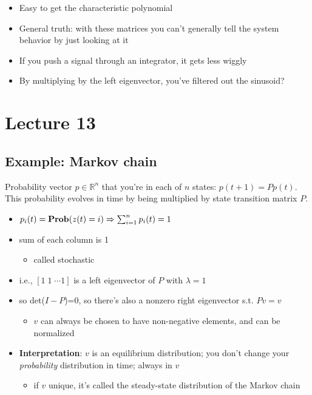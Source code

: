 \documentclass[10pt,letterpaper]{article}
\begin{document}
\begin{itemize}
\item Easy to get the characteristic polynomial
\item General truth: with these matrices you can't generally tell the system behavior by just looking at it
\item If you push a signal through an integrator, it gets less wiggly
\item By multiplying by the left eigenvector, you've filtered out the sinusoid?
\end{itemize}
\section{Lecture 13}
\label{sec-11}
\subsection{Example: Markov chain}
\label{sec-11_1}

Probability vector $p \in \mathbb{R}^{n}$ that you're in each of $n$ states: $p(t+1)=Pp(t)$. This probability evolves in time by being multiplied by state transition matrix $P$.
\begin{itemize}
\item $p _{i} (t)= {\bf Prob} (z(t)=i) \Rightarrow \sum ^{n} _{i=1} p _{i} (t) =1$
\item sum of each column is 1

\begin{itemize}
\item called stochastic
\end{itemize}

\item i.e., $[1\;1\; \cdots 1]$ is a left eigenvector of $P$ with $\lambda = 1$
\item so det($I-P$)=0, so there's also a nonzero right eigenvector s.t. $Pv=v$

\begin{itemize}
\item $v$ can always be chosen to have non-negative elements, and can be normalized
\end{itemize}

\item \textbf{Interpretation}: $v$ is an equilibrium distribution; you don't change your \emph{probability} distribution in time; always in $v$

\begin{itemize}
\item if $v$ unique, it's called the steady-state distribution of the Markov chain
\end{itemize}

\end{itemize}
\end{document}
